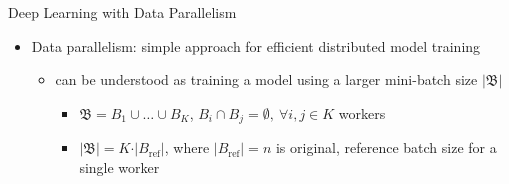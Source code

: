 \begin{frame}{Deep Learning with Data Parallelism}
\protect\hypertarget{deep-learning-with-data-parallelism-3}{}

\begin{itemize}
\tightlist
\item
  Data parallelism: simple approach for efficient distributed model
  training

  \begin{itemize}
  \tightlist
  \item
    can be understood as training a model using a larger mini-batch size
    \(\vert \mathfrak{B} \vert\)

    \begin{itemize}
    \tightlist
    \item
      \(\mathfrak{B} = B_1 \cup \ldots \cup B_K\),
      \(B_i \cap B_j = \emptyset,\ \forall i,j \in K\) workers
      \vspace*{2mm}
    \item
      \(\vert \mathfrak{B} \vert = K \cdot \vert B_{\text{ref}} \vert\),
      where \(\vert B_{\text{ref}} \vert = n\) is original, reference
      batch size for a single worker
    \end{itemize}
  \end{itemize}
\end{itemize}


\end{frame}

